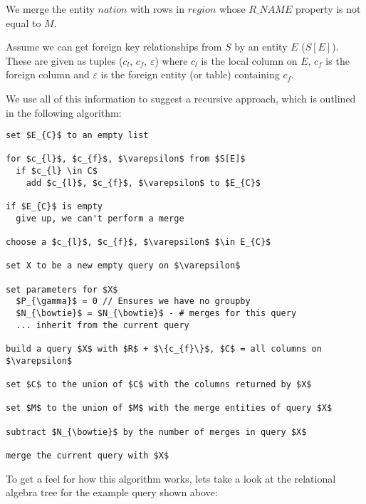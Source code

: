 \documentclass[10pt, twocolumn]{article}
\begin{document}
\noindent
We merge the entity $nation$ with rows in $region$ whose $R\_NAME$ property is not equal to $M$.

\spacing
\noindent
Assume we can get foreign key relationships from $S$ by an entity $E$ ($S[E]$). These are given as tuples ($c_{l}$, $c_{f}$, $\varepsilon$) where $c_{l}$ is the local column on $E$, $c_{f}$ is the foreign column and $\varepsilon$ is the foreign entity (or table) containing $c_{f}$.

\spacing
\noindent
We use all of this information to suggest a recursive approach, which is outlined in the following algorithm:

\spacing
\begin{lstlisting}
set $E_{C}$ to an empty list

for $c_{l}$, $c_{f}$, $\varepsilon$ from $S[E]$
  if $c_{l} \in C$
    add $c_{l}$, $c_{f}$, $\varepsilon$ to $E_{C}$

if $E_{C}$ is empty
  give up, we can't perform a merge

choose a $c_{l}$, $c_{f}$, $\varepsilon$ $\in E_{C}$

set X to be a new empty query on $\varepsilon$

set parameters for $X$
  $P_{\gamma}$ = 0 // Ensures we have no groupby
  $N_{\bowtie}$ = $N_{\bowtie}$ - # merges for this query
  ... inherit from the current query

build a query $X$ with $R$ + $\{c_{f}\}$, $C$ = all columns on $\varepsilon$

set $C$ to the union of $C$ with the columns returned by $X$

set $M$ to the union of $M$ with the merge entities of query $X$

subtract $N_{\bowtie}$ by the number of merges in query $X$

merge the current query with $X$
\end{lstlisting}

\spacing
\noindent
To get a feel for how this algorithm works, lets take a look at the relational algebra tree for the example query shown above:

\spacing
{}
\end{document}
